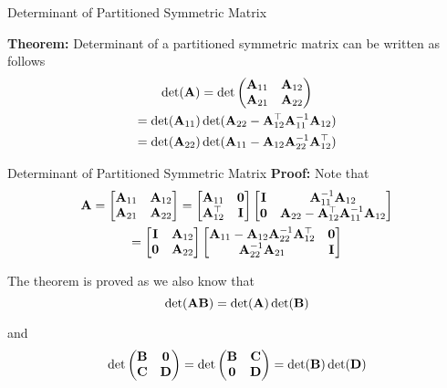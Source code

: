 \documentclass{beamer}
\begin{document}
\begin{frame}{Determinant of Partitioned Symmetric Matrix}
	
	\textbf{Theorem:} Determinant of a partitioned symmetric matrix can be written as follows
	\begin{gather}
	\operatorname{det}(\mathbf{A}) = \operatorname{det} \left( 
	\begin{matrix}
	\mathbf{A}_{11}&\mathbf{A}_{12}\\
	\mathbf{A}_{21}&\mathbf{A}_{22}
	\end{matrix}
	\right) \\
	=\operatorname{det}(\mathbf{A}_{11})\operatorname{det}(\mathbf{A}_{22}-\mathbf{A}_{12}^\top\mathbf{A}_{11}^{-1}\mathbf{A}_{12}) \\
	=\operatorname{det}(\mathbf{A}_{22})\operatorname{det}(\mathbf{A}_{11}-\mathbf{A}_{12}\mathbf{A}_{22}^{-1}\mathbf{A}_{12}^\top)
	\end{gather}
\end{frame}

\begin{frame}{Determinant of Partitioned Symmetric Matrix}
	\textbf{Proof:} Note that
	\begin{gather}
	\mathbf{A} = 
	\begin{bmatrix}
	\mathbf{A}_{11}&\mathbf{A}_{12} \\
	\mathbf{A}_{21}&\mathbf{A}_{22}
	\end{bmatrix}
	= 
	\begin{bmatrix}
	\mathbf{A}_{11}& \mathbf{0} \\
	\mathbf{A}_{12}^\top& \mathbf{I}
	\end{bmatrix}
	\begin{bmatrix}
	\mathbf{I} & \mathbf{A}_{11}^{-1}\mathbf{A}_{12} \\
	\mathbf{0} & \mathbf{A}_{22} - \mathbf{A}_{12}^\top\mathbf{A}_{11}^{-1}\mathbf{A}_{12}
	\end{bmatrix}\\
	= 
	\begin{bmatrix}
	\mathbf{I} & \mathbf{A}_{12} \\
	\mathbf{0} & \mathbf{A}_{22}
	\end{bmatrix}
	\begin{bmatrix}
	\mathbf{A}_{11} - \mathbf{A}_{12}\mathbf{A}_{22}^{-1}\mathbf{A}_{12}^\top & \mathbf{0}\\
	\mathbf{A}_{22}^{-1}\mathbf{A}_{21}  & \mathbf{I}
	\end{bmatrix}
	\end{gather} 
	
	The theorem is proved as we also know that
	\begin{equation}
	\operatorname{det}(\mathbf{A}\mathbf{B})=\operatorname{det}(\mathbf{A}) \operatorname{det}(\mathbf{B}) 
	\end{equation}
	
	and
	\begin{equation}
	\operatorname{det} \left( 
	\begin{matrix}
	\mathbf{B}&\mathbf{0} \\
	\mathbf{C}&\mathbf{D}
	\end{matrix} 
	\right)
	=
	\operatorname{det} \left(
	\begin{matrix}
	\mathbf{B}&\mathbf{C} \\
	\mathbf{0}&\mathbf{D}
	\end{matrix}
	\right)
	=
	\operatorname{det}(\mathbf{B})\operatorname{det}(\mathbf{D})
	\end{equation}	
\end{frame}
\end{document}
